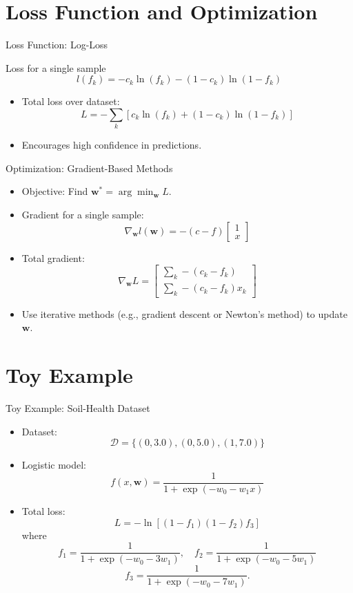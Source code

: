 \documentclass{beamer}
\begin{document}
\section{Loss Function and Optimization}
\begin{frame}{Loss Function: Log-Loss}
  \begin{block}{Loss for a single sample}
    \[
    l(f_k) = -c_k\ln(f_k) - (1-c_k)\ln(1-f_k)
    \]
  \end{block}
  \begin{itemize}
    \item Total loss over dataset:
      \[
      L = -\sum_k \left[c_k\ln(f_k) + (1-c_k)\ln(1-f_k)\right]
      \]
    \item Encourages high confidence in predictions.
  \end{itemize}
\end{frame}

\begin{frame}{Optimization: Gradient-Based Methods}
  \begin{itemize}
    \item Objective: Find \(\mathbf{w}^* = \arg\min_{\mathbf{w}} L\).
    \item Gradient for a single sample:
      \[
      \nabla_\mathbf{w} l(\mathbf{w}) = -(c-f)
      \begin{bmatrix} 1 \\ x \end{bmatrix}
      \]
    \item Total gradient:
      \[
      \nabla_\mathbf{w} L =
      \begin{bmatrix}
      \sum_k -(c_k - f_k) \\
      \sum_k -(c_k - f_k)x_k
      \end{bmatrix}
      \]
    \item Use iterative methods (e.g., gradient descent or Newton's method) to update \(\mathbf{w}\).
  \end{itemize}
\end{frame}

\section{Toy Example}
\begin{frame}{Toy Example: Soil-Health Dataset}
  \begin{itemize}
    \item Dataset: 
      \[
      \mathcal{D} = \{(0,3.0), (0,5.0), (1,7.0)\}
      \]
    \item Logistic model:
      \[
      f(x,\mathbf{w}) = \frac{1}{1+\exp(-w_0-w_1x)}
      \]
    \item Total loss:
      \[
      L = -\ln\left[(1-f_1)(1-f_2)f_3\right]
      \]
      where
      \[
      f_1 = \frac{1}{1+\exp(-w_0-3w_1)},\quad
      f_2 = \frac{1}{1+\exp(-w_0-5w_1)}
      \]
      \[
      f_3 = \frac{1}{1+\exp(-w_0-7w_1)}.
      \]
  \end{itemize}
\end{frame}
\end{document}
